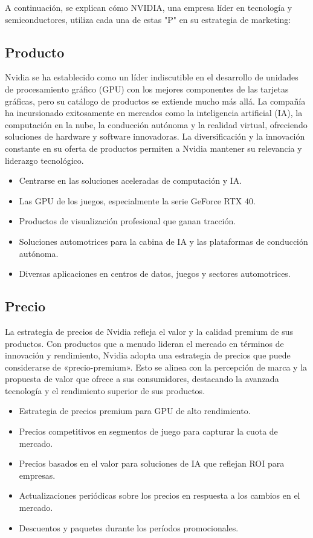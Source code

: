 \documentclass{article}
\begin{document}
A continuación, se explican cómo NVIDIA, una empresa líder en tecnología y semiconductores, utiliza cada una de estas "P" en su estrategia de marketing: 

\subsection{Producto}

Nvidia se ha establecido como un líder indiscutible en el desarrollo de unidades de procesamiento gráfico (GPU) con los mejores componentes de las tarjetas gráficas, pero su catálogo de productos se extiende mucho más allá. La compañía ha incursionado exitosamente en mercados como la inteligencia artificial (IA), la computación en la nube, la conducción autónoma y la realidad virtual, ofreciendo soluciones de hardware y software innovadoras. La diversificación y la innovación constante en su oferta de productos permiten a Nvidia mantener su relevancia y liderazgo tecnológico.

\begin{itemize}
  \item Centrarse en las soluciones aceleradas de computación y IA.
  \item Las GPU de los juegos, especialmente la serie GeForce RTX 40.
  \item Productos de visualización profesional que ganan tracción.
  \item Soluciones automotrices para la cabina de IA y las plataformas de conducción autónoma.
  \item Diversas aplicaciones en centros de datos, juegos y sectores automotrices.
\end{itemize}

\subsection{Precio}

La estrategia de precios de Nvidia refleja el valor y la calidad premium de sus productos. Con productos que a menudo lideran el mercado en términos de innovación y rendimiento, Nvidia adopta una estrategia de precios que puede considerarse de «precio-premium». Esto se alinea con la percepción de marca y la propuesta de valor que ofrece a sus consumidores, destacando la avanzada tecnología y el rendimiento superior de sus productos.

\begin{itemize}
  \item Estrategia de precios premium para GPU de alto rendimiento.
  \item Precios competitivos en segmentos de juego para capturar la cuota de mercado.
  \item Precios basados en el valor para soluciones de IA que reflejan ROI para empresas.
  \item Actualizaciones periódicas sobre los precios en respuesta a los cambios en el mercado.
  \item Descuentos y paquetes durante los períodos promocionales.
\end{itemize}
\end{document}
